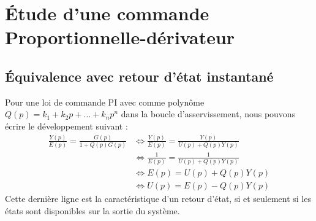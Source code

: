 \chapter{Étude d'une commande Proportionnelle-dérivateur}

\section{Équivalence avec retour d'état instantané}
Pour une loi de commande PI avec comme polynôme $Q(p) = k_1+k_2p+...+k_np^n$ dans la boucle d'asservissement, nous pouvons écrire le développement suivant : 
\begin{align*}
\frac{Y(p)}{E(p)} = \frac{G(p)}{1 + Q(p)G(p)} & \Leftrightarrow \frac{Y(p)}{E(p)} = \frac{Y(p)}{U(p) + Q(p)Y(p)}\\
&\Leftrightarrow \frac{1}{E(p)} = \frac{1}{U(p) + Q(p)Y(p)} \\
& \Leftrightarrow E(p) = U(p) + Q(p)Y(p)\\
& \Leftrightarrow U(p) = E(p) - Q(p)Y(p)
\end{align*} 
Cette dernière ligne est la caractéristique d'un retour d'état, si et seulement si les états sont disponibles sur la sortie du système.